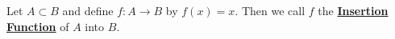 \newcommand{\InsertionFunction}[0]{\textbf{\hyperref[def:InsertionFunction]{Insertion Function}}\xspace}
\newcommand{\InsertionFunctions}[0]{\textbf{\hyperref[def:InsertionFunction]{Insertion Functions}}\xspace}
\begin{df}
\label{def:InsertionFunction}

\rm
    Let $A \subset B$ and define 
    $f:A \to B$ by $f(x)=x$. 
    Then we call $f$ the 
    \InsertionFunction of $A$ into $B$. 
\end{df}

